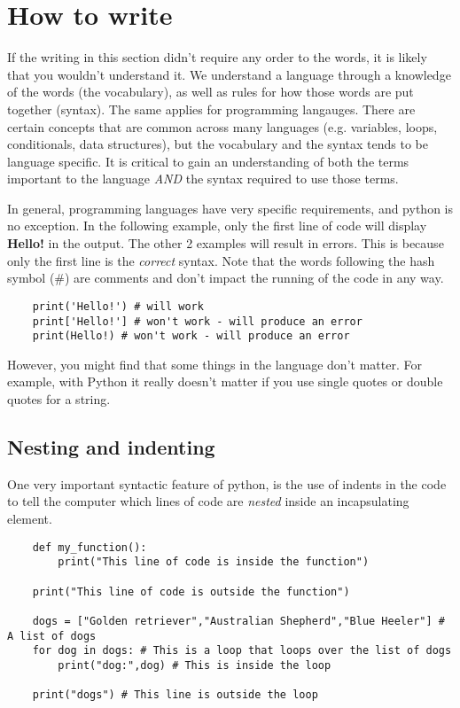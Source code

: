 \section{How to write}

If the writing in this section didn't require any order to the words, it is likely that you wouldn't understand it. We understand a language through a knowledge of the words (the vocabulary), as well as rules for how those words are put together (syntax). The same applies for programming langauges. There are certain concepts that are common across many languages (e.g. variables, loops, conditionals, data structures), but the vocabulary and the syntax tends to be language specific. It is critical to gain an understanding of both the terms important to the language \textit{AND} the syntax required to use those terms.

In general, programming languages have very specific requirements, and python is no exception. In the following example, only the first line of code will display \textbf{Hello!} in the output. The other 2 examples will result in errors. This is because only the first line is the \textit{correct} syntax. Note that the words following the hash symbol (\#) are comments and don't impact the running of the code in any way.

\begin{verbatim}
    print('Hello!') # will work
    print['Hello!'] # won't work - will produce an error
    print(Hello!) # won't work - will produce an error
\end{verbatim}

However, you might find that some things in the language don't matter. For example, with Python it really doesn't matter if you use single quotes or double quotes for a string.

\subsection{Nesting and indenting}

One very important syntactic feature of python, is the use of indents in the code to tell the computer which lines of code are \textit{nested} inside an incapsulating element.

\begin{verbatim}
    def my_function():
        print("This line of code is inside the function")

    print("This line of code is outside the function")

    dogs = ["Golden retriever","Australian Shepherd","Blue Heeler"] # A list of dogs
    for dog in dogs: # This is a loop that loops over the list of dogs
        print("dog:",dog) # This is inside the loop

    print("dogs") # This line is outside the loop
\end{verbatim}





